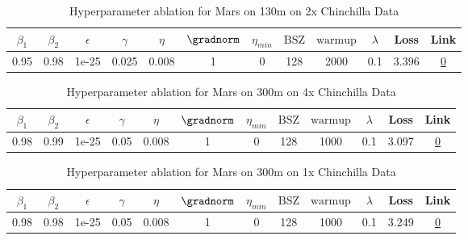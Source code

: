\begin{table}[H]
\centering
\caption{Hyperparameter ablation for Mars on 130m on 2x Chinchilla Data}
\label{tab:ablation_mars_130m_2}
\begin{tabular}{cccccccccccc}
\toprule
$\beta_1$ & $\beta_2$ & $\epsilon$ & $\gamma$ & $\eta$ & $\gradnorm$ & $\eta_{min}$ & $\mathrm{BSZ}$ & $\mathrm{warmup}$ & $\lambda$ & Loss & Link \\
\midrule
0.95 & 0.98 & 1e-25 & 0.025 & 0.008 & 1 & 0 & 128 & 2000 & 0.1 & 3.396 & \href{https://wandb.ai/stanford-mercury/optimizer-scaling/runs/sweep-130m-5B-marsc95aa3lr0.008-wd0.1-minlr0-warmup2000-b10.95-b-7a23c5}{0} \\
\midrule
\bottomrule
\end{tabular}
\end{table}

\begin{table}[H]
\centering
\caption{Hyperparameter ablation for Mars on 300m on 4x Chinchilla Data}
\label{tab:ablation_mars_300m_4}
\begin{tabular}{cccccccccccc}
\toprule
$\beta_1$ & $\beta_2$ & $\epsilon$ & $\gamma$ & $\eta$ & $\gradnorm$ & $\eta_{min}$ & $\mathrm{BSZ}$ & $\mathrm{warmup}$ & $\lambda$ & Loss & Link \\
\midrule
0.98 & 0.99 & 1e-25 & 0.05 & 0.008 & 1 & 0 & 128 & 1000 & 0.1 & 3.097 & \href{https://wandb.ai/stanford-mercury/optimizer-scaling/runs/sweep-300m-24B-mars3a0394lr0.008-wd0.1-minlr0-warmup1000-b10.98--79e319}{0} \\
\midrule
\bottomrule
\end{tabular}
\end{table}

\begin{table}[H]
\centering
\caption{Hyperparameter ablation for Mars on 300m on 1x Chinchilla Data}
\label{tab:ablation_mars_300m_1}
\begin{tabular}{cccccccccccc}
\toprule
$\beta_1$ & $\beta_2$ & $\epsilon$ & $\gamma$ & $\eta$ & $\gradnorm$ & $\eta_{min}$ & $\mathrm{BSZ}$ & $\mathrm{warmup}$ & $\lambda$ & Loss & Link \\
\midrule
0.98 & 0.98 & 1e-25 & 0.05 & 0.008 & 1 & 0 & 128 & 1000 & 0.1 & 3.249 & \href{https://wandb.ai/stanford-mercury/optimizer-scaling/runs/sweep-300m-6B-mars9c7f7elr0.008-wd0.1-minlr0-warmup1000-b10.98-b-f63232}{0} \\
\midrule
\bottomrule
\end{tabular}
\end{table}

